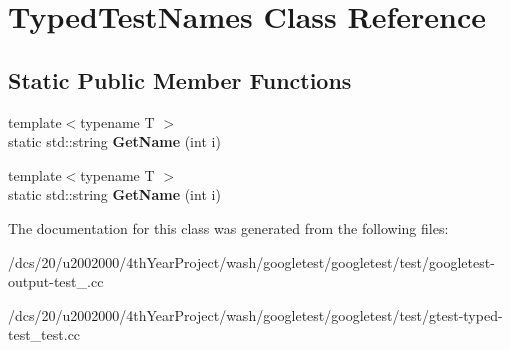 \hypertarget{classTypedTestNames}{}\section{Typed\+Test\+Names Class Reference}
\label{classTypedTestNames}
\subsection*{Static Public Member Functions}
\begin{DoxyCompactItemize}
\item 
\mbox{\label{classTypedTestNames_af76babb242eca31c257de2f0b74973c1}} 
{\footnotesize template$<$typename T $>$ }\\static std\+::string {\bfseries Get\+Name} (int i)
\item 
\mbox{\label{classTypedTestNames_af76babb242eca31c257de2f0b74973c1}} 
{\footnotesize template$<$typename T $>$ }\\static std\+::string {\bfseries Get\+Name} (int i)
\end{DoxyCompactItemize}


The documentation for this class was generated from the following files\+:\begin{DoxyCompactItemize}
\item 
/dcs/20/u2002000/4th\+Year\+Project/wash/googletest/googletest/test/googletest-\/output-\/test\+\_\+.\+cc\item 
/dcs/20/u2002000/4th\+Year\+Project/wash/googletest/googletest/test/gtest-\/typed-\/test\+\_\+test.\+cc\end{DoxyCompactItemize}
